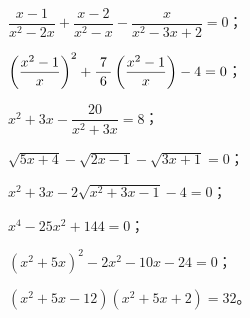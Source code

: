 \begin{xiaotis}
\begin{enhancedline}
\begin{xiaoxiaotis}


\end{xiaoxiaotis}


%
\begin{xiaoxiaotis}%

\end{xiaoxiaotis}




\xiaoti{}%
\begin{xiaoxiaotis}%


    \hspace{4em}  $\dfrac{x- 1}{x^2 - 2x} + \dfrac{x - 2}{x^2 - x} - \dfrac{x}{x^2 - 3x + 2} = 0$；

    \hspace{4em}  $\left( \dfrac{x^2 - 1}{x} \right)^2 + \dfrac{\; 7 \;}{6} \left( \dfrac{x^2 - 1}{x} \right) - 4 = 0$；

    \hspace{4em}  $x^2 + 3x - \dfrac{20}{x^2 + 3x} = 8$；

    \hspace{4em}  $\sqrt{5x +4} - \sqrt{2x - 1} - \sqrt{3x + 1} = 0$；

    \hspace{4em}  $x^2 + 3x - 2\sqrt{x^2 + 3x - 1} - 4 = 0$；

    \hspace{4em}  $x^4 - 25x^2 + 144 = 0$；

    \hspace{4em}  $(x^2 + 5x)^2 - 2x^2 - 10x - 24 = 0$；

    \hspace{4em}  $(x^2 + 5x - 12) (x^2 + 5x + 2) = 32$。

\end{xiaoxiaotis}


\begin{xiaoxiaotis}



\end{xiaoxiaotis}
\end{enhancedline}
\end{xiaotis}
